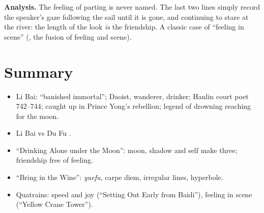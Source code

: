 \textbf{Analysis.} The feeling of parting is never named. The last two lines simply record
the speaker's gaze following the sail until it is gone, and continuing to stare at the
river: the length of the look \emph{is} the friendship. A classic case of ``feeling in
scene'' (, the fusion of feeling and scene).

\section*{Summary}
\begin{itemize}
  \item Li Bai: ``banished immortal''; Daoist, wanderer, drinker; Hanlin court poet
        742--744; caught up in Prince Yong's rebellion; legend of drowning reaching for the
        moon.
  \item Li Bai  vs Du Fu .
  \item ``Drinking Alone under the Moon'': moon, shadow and self make three; friendship free
        of feeling.
  \item ``Bring in the Wine'': \emph{yuefu}, carpe diem, irregular lines, hyperbole.
  \item Quatrains: speed and joy (``Setting Out Early from Baidi''), feeling in scene
        (``Yellow Crane Tower'').
\end{itemize}
